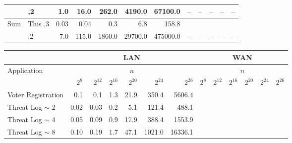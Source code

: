 \begin{figure*}[t!]
\begin{tabular}{|l |l|| r | r |r |r|r||r | r |r |r|r|}
	                              & \cite{DBLP:conf/cans/CristofaroGT12} \hfill ,2 & 1.0   & 16.0     & 262.0    & 4190.0   &  67100.0 &    -- & --       & --       & --       &       -- \\ \hline\hline
	\multirow{2}{*}{Sum}          & This                           \hfill ,3       & 0.03  & 0.04     & 0.3      & 6.8      &    158.8 &       &          &          &          &          \\ \cline{2-12}
	                              & \cite{cryptoeprint:2017:738}    \hfill ,2      & 7.0   & 115.0    & 1860.0   & 29700.0  & 475000.0 &    -- & --       & --       & --       &       -- \\ \hline
\end{tabular}
\caption{	 }
\end{figure*}




\begin{figure*}[t!]\centering\footnotesize\label{fig:app}
	\begin{tabular}{|l|| r | r |r |r|r|r||r|r | r |r |r|r|}
		\cline{2-13}
		\multicolumn{1}{c}{}         & \multicolumn{6}{|c||}{LAN}                                   & \multicolumn{6}{|c|}{WAN}                                    \\ \hline
		\multirow{2}{*}{Application} &                  \multicolumn{6}{c||}{$n$}                   &                   \multicolumn{6}{c|}{$n$}                   \\
		                             & $2^8$ & $2^{12}$ & $2^{16}$ & $2^{20}$ & $2^{24}$ & $2^{26}$ & $2^8$ & $2^{12}$ & $2^{16}$ & $2^{20}$ & $2^{24}$ & $2^{26}$ \\ \hline\hline
		Voter Registration           & 0.1   & 0.1      & 1.3      & 21.9     &    350.4 &   5606.4 &       &          &          &          &          &          \\ \hline
		Threat Log $\sim$ 2          & 0.02  & 0.03     & 0.2      & 5.1      &    121.4 &    488.1 &       &          &          &          &          &          \\ \hline
		Threat Log $\sim$ 4          & 0.05  & 0.09     & 0.9      & 17.9     &    388.4 &   1553.9 &       &          &          &          &          &          \\ \hline
		Threat Log $\sim$ 8          & 0.10  & 0.19     & 1.7      & 47.1     &   1021.0 &  16336.1 &       &          &          &          &          &          \\ \hline
	\end{tabular}
	\caption{	 }
\end{figure*}